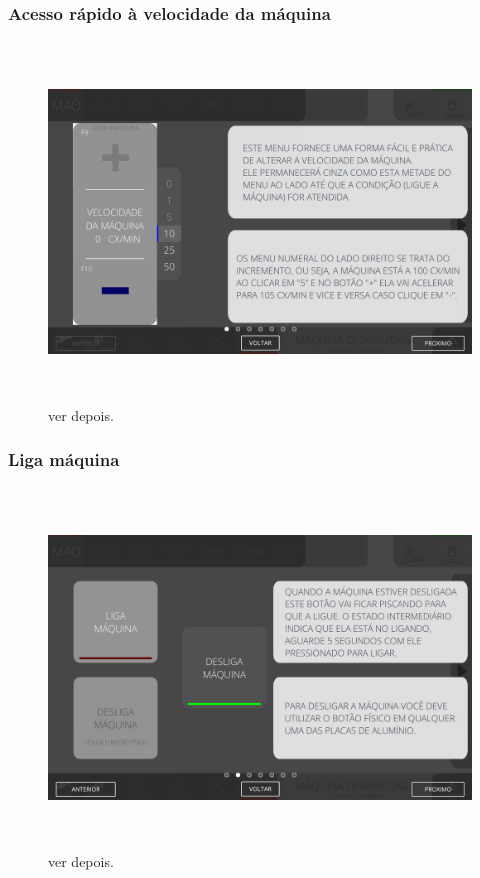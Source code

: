 \subsubsection{\small{Acesso rápido à velocidade da máquina}}

\begin{figure}[h]
  \centering
  \includegraphics[width=576px,height=360px]{src/imagesFlexo/02-machine/e-1.png}
  \caption{ver depois.}
   \label{}
\end{figure}

\vspace*{\fill}

\newpage
\thispagestyle{fancy}

\vspace*{\fill}

\subsubsection{\small{Liga máquina}}

\begin{figure}[h]
  \centering
  \includegraphics[width=576px,height=360px]{src/imagesFlexo/02-machine/e-2.png}
  \caption{ver depois.}
   \label{}
\end{figure}

